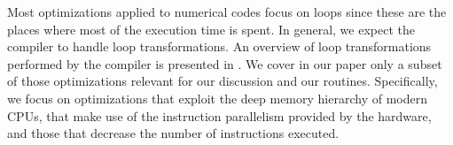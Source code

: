 
Most optimizations applied to numerical codes focus on loops since these are the
places where most of the execution time is spent. In general, we expect the
compiler to handle loop transformations. An overview of loop transformations
performed by the compiler is presented in \cite{Bacon:1994:CTH:197405.197406}.
We cover in our paper only a subset of those optimizations relevant for our
discussion and our routines. Specifically, we focus on optimizations that
exploit the deep memory hierarchy of modern CPUs, that make use of the
instruction parallelism provided by the hardware, and those that decrease the
number of instructions executed.


